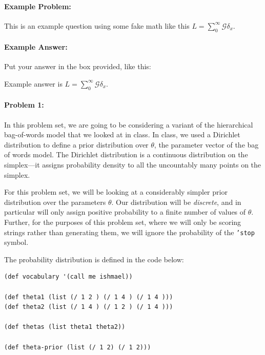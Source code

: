 \documentclass[10pt]{article}
\newenvironment{AnswerBox}{\begin{mdframed}[style=simple]}{\end{mdframed}}
\begin{document}
\hrulefill %

\paragraph{Example Problem:}
This is an example question using some fake math like this
$L=\sum_0^{\infty} \mathcal{G} \delta_x$.

\paragraph{Example Answer:} Put your answer in the box provided, like this:
\begin{AnswerBox}
Example answer is $L=\sum_0^{\infty} \mathcal{G} \delta_x$.
\end{AnswerBox}



\hrulefill%

\pagebreak%

\paragraph{Problem 1:}
In this problem set, we are going to be considering a variant of the
hierarchical bag-of-words model that we looked at in class. In class,
we used a Dirichlet distribution to define a prior distribution over
$\theta$, the parameter vector of the bag of words model. The
Dirichlet distribution is a continuous distribution on the
simplex---it assigns probability density to all the uncountably many
points on the simplex.

For this problem set, we will be looking at a considerably simpler
prior distribution over the parameters $\theta$. Our distribution will
be \emph{discrete}, and in particular will only assign positive
probability to a finite number of values of $\theta$. Further, for the
purposes of this problem set, where we will only be scoring strings
rather than generating them, we will ignore the probability of the
\texttt{'stop} symbol.

The probability distribution is defined in the code below:

\begin{lstlisting}
(def vocabulary '(call me ishmael))

(def theta1 (list (/ 1 2 ) (/ 1 4 ) (/ 1 4 )))
(def theta2 (list (/ 1 4 ) (/ 1 2 ) (/ 1 4 )))

(def thetas (list theta1 theta2))

(def theta-prior (list (/ 1 2) (/ 1 2)))
\end{lstlisting}
\end{document}
